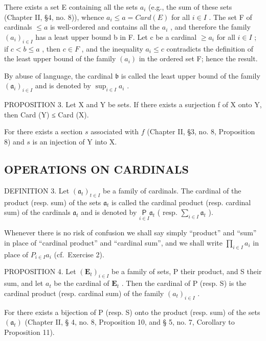 There exists a set E containing all the sets \(a_{i}\) (e.g., the sum of these sets (Chapter II, §4, no. 8)), whence \(a_{i} \leqslant a = Card(E)\) for all \(i \in I\) . The set F of cardinals \(\leqslant a\) is well-ordered and contains all the \(a_{i}\) , and therefore the family \((a_{i})_{i \in I}\) has a least upper bound b in F. Let c be a cardinal \(\geqslant a_{i}\) for all \(i \in I\) ; if \(c < b \leqslant a\) , then \(c \in F\) , and the inequality \(a_{i} \leqslant c\) contradicts the definition of the least upper bound of the family \((a_{i})\) in the ordered set F; hence the result.

By abuse of language, the cardinal \(\mathfrak{b}\) is called the least upper bound of the family \((\mathfrak{a}_i)_{i\in I}\) and is denoted by \(\sup_{i\in I}a_i\) .

PROPOSITION 3. Let X and Y be sets. If there exists a surjection f of X onto Y, then Card (Y) ≤ Card (X).

For there exists a section \(s\) associated with \(f\) (Chapter II, §3, no. 8, Proposition 8) and \(s\) is an injection of Y into X.

\subsection{OPERATIONS ON CARDINALS}

DEFINITION 3. Let \((\mathfrak{a}_t)_{t \in I}\) be a family of cardinals. The cardinal of the product (resp. sum) of the sets \(\mathfrak{a}_t\) is called the cardinal product (resp. cardinal sum) of the cardinals \(\mathfrak{a}_t\) and is denoted by \(\underset{i \in I}{\mathsf{P}} \mathfrak{a}_t\) ( \(\text{resp. } \sum_{i \in I} \mathfrak{a}_t\) ).

Whenever there is no risk of confusion we shall say simply ``product'' and ``sum'' in place of ``cardinal product'' and ``cardinal sum'', and we shall write \(\prod_{i\in I}a_{i}\) in place of \(P_{i\in I}a_{i}\) (cf.~Exercise 2).

PROPOSITION 4. Let \((\mathbf{E}_t)_{i \in I}\) be a family of sets, P their product, and S their sum, and let \(a_t\) be the cardinal of \(\mathbf{E}_t\) . Then the cardinal of P (resp. S) is the cardinal product (resp. cardinal sum) of the family \((a_t)_{i \in I}\) .

For there exists a bijection of P (resp. S) onto the product (resp. sum) of the sets \((\mathfrak{a}_{t})\) (Chapter II, § 4, no. 8, Proposition 10, and § 5, no. 7, Corollary to Proposition 11).

